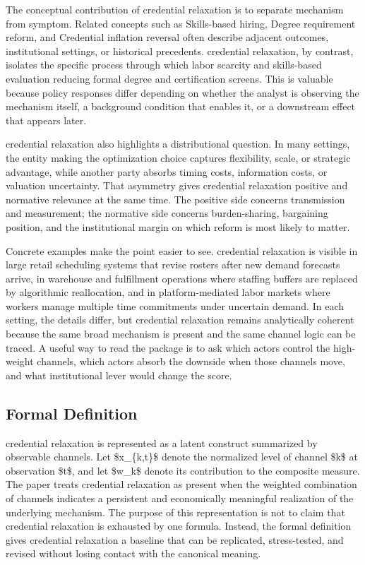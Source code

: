 \documentclass[12pt]{article}
\begin{document}
The conceptual contribution of credential relaxation is to separate mechanism from symptom. Related concepts such as Skills-based hiring, Degree requirement reform, and Credential inflation reversal often describe adjacent outcomes, institutional settings, or historical precedents. credential relaxation, by contrast, isolates the specific process through which labor scarcity and skills-based evaluation reducing formal degree and certification screens. This is valuable because policy responses differ depending on whether the analyst is observing the mechanism itself, a background condition that enables it, or a downstream effect that appears later.

credential relaxation also highlights a distributional question. In many settings, the entity making the optimization choice captures flexibility, scale, or strategic advantage, while another party absorbs timing costs, information costs, or valuation uncertainty. That asymmetry gives credential relaxation positive and normative relevance at the same time. The positive side concerns transmission and measurement; the normative side concerns burden-sharing, bargaining position, and the institutional margin on which reform is most likely to matter.

Concrete examples make the point easier to see. credential relaxation is visible in large retail scheduling systems that revise rosters after new demand forecasts arrive, in warehouse and fulfillment operations where staffing buffers are replaced by algorithmic reallocation, and in platform-mediated labor markets where workers manage multiple time commitments under uncertain demand. In each setting, the details differ, but credential relaxation remains analytically coherent because the same broad mechanism is present and the same channel logic can be traced. A useful way to read the package is to ask which actors control the high-weight channels, which actors absorb the downside when those channels move, and what institutional lever would change the score.

\subsection{Formal Definition}
credential relaxation is represented as a latent construct summarized by observable channels. Let \$x\_\{k,t\}\$ denote the normalized level of channel \$k\$ at observation \$t\$, and let \$w\_k\$ denote its contribution to the composite measure. The paper treats credential relaxation as present when the weighted combination of channels indicates a persistent and economically meaningful realization of the underlying mechanism. The purpose of this representation is not to claim that credential relaxation is exhausted by one formula. Instead, the formal definition gives credential relaxation a baseline that can be replicated, stress-tested, and revised without losing contact with the canonical meaning.
\end{document}
